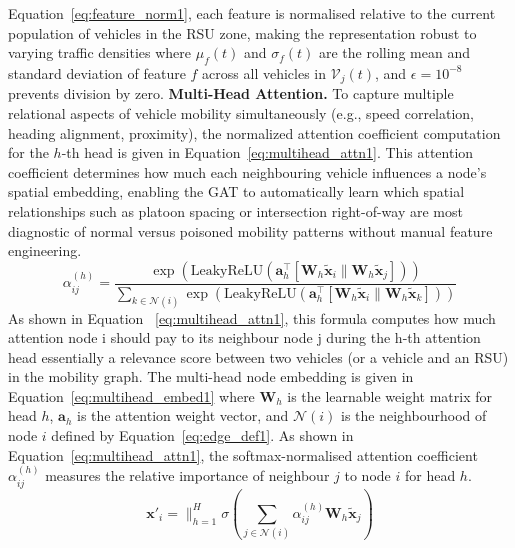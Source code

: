 \documentclass[12pt, a4paper]{report}
\begin{document}
Equation~\ref{eq:feature_norm1}, each feature is normalised relative
to the current population of vehicles in the RSU zone, making the
representation robust to varying traffic densities where $\mu_f(t)$ and $\sigma_f(t)$ are the rolling mean and standard
deviation of feature $f$ across all vehicles in $\mathcal{V}_j(t)$,
and $\epsilon = 10^{-8}$ prevents division by zero.
\newline
\newline
\textbf{Multi-Head Attention.}
To capture multiple relational aspects of vehicle mobility simultaneously
(e.g., speed correlation, heading alignment, proximity), the normalized
attention coefficient computation for the $h$-th head is given in
Equation~\ref{eq:multihead_attn1}.
\newline
\newline
This attention coefficient determines how much each neighbouring
vehicle influences a node's spatial embedding, enabling the GAT to
automatically learn which spatial relationships  such as platoon
spacing or intersection right-of-way  are most diagnostic of normal
versus poisoned mobility patterns without manual feature engineering.
\begin{equation}
  \alpha_{ij}^{(h)} = \frac{\exp\!\left(
    \mathrm{LeakyReLU}(\mathbf{a}_h^\top
    [\mathbf{W}_h\tilde{\mathbf{x}}_i \| \mathbf{W}_h\tilde{\mathbf{x}}_j])
  \right)}
  {\sum_{k\in\mathcal{N}(i)}\exp\!\left(
    \mathrm{LeakyReLU}(\mathbf{a}_h^\top
    [\mathbf{W}_h\tilde{\mathbf{x}}_i \| \mathbf{W}_h\tilde{\mathbf{x}}_k])
  \right)}
  \label{eq:multihead_attn1}
\end{equation}
\newline
\newline
As shown in Equation ~\ref{eq:multihead_attn1}, this formula computes how much attention node i should pay to its neighbour node j during the h-th attention head  essentially a relevance score between two vehicles (or a vehicle and an RSU) in the mobility graph.
\newline
\newline
The multi-head node embedding is given in
Equation~\ref{eq:multihead_embed1} where $\mathbf{W}_h$ is the learnable weight matrix for head $h$,
$\mathbf{a}_h$ is the attention weight vector, and $\mathcal{N}(i)$
is the neighbourhood of node $i$ defined by Equation~\ref{eq:edge_def1}.
As shown in Equation~\ref{eq:multihead_attn1}, the softmax-normalised
attention coefficient $\alpha_{ij}^{(h)}$ measures the relative
importance of neighbour $j$ to node $i$ for head $h$.
\begin{equation}
  \mathbf{x}'_i = \Big\|_{h=1}^{H}
  \sigma\!\left(\sum_{j\in\mathcal{N}(i)} \alpha_{ij}^{(h)}
  \mathbf{W}_h\tilde{\mathbf{x}}_j\right)
  \label{eq:multihead_embed1}
\end{equation}
\end{document}
